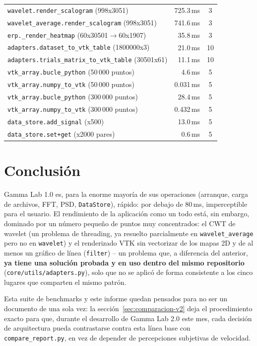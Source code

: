 \documentclass[11pt,a4paper]{article}
\begin{document}
\begin{center}
\begin{longtable}{L{9.5cm}rc}
\texttt{wavelet.render\_\allowbreak scalogram} (998x3051) & 725.3\,ms & 3 \\
\texttt{wavelet\_\allowbreak average.render\_\allowbreak scalogram} (998x3051) & 741.6\,ms & 3 \\
\texttt{erp.\_\allowbreak render\_\allowbreak heatmap} (60x30501$\to$60x1907) & 35.8\,ms & 3 \\
\texttt{adapters.dataset\_\allowbreak to\_\allowbreak vtk\_\allowbreak table} (1800000x3) & 21.0\,ms & 10 \\
\texttt{adapters.trials\_\allowbreak matrix\_\allowbreak to\_\allowbreak vtk\_\allowbreak table} (30501x61) & 11.1\,ms & 10 \\
\texttt{vtk\_\allowbreak array.bucle\_\allowbreak python} (50\,000 puntos) & 4.6\,ms & 5 \\
\texttt{vtk\_\allowbreak array.numpy\_\allowbreak to\_\allowbreak vtk} (50\,000 puntos) & 0.031\,ms & 5 \\
\texttt{vtk\_\allowbreak array.bucle\_\allowbreak python} (300\,000 puntos) & 28.4\,ms & 5 \\
\texttt{vtk\_\allowbreak array.numpy\_\allowbreak to\_\allowbreak vtk} (300\,000 puntos) & 0.432\,ms & 5 \\
\texttt{data\_\allowbreak store.add\_\allowbreak signal} (x500) & 13.0\,ms & 5 \\
\texttt{data\_\allowbreak store.set+get} (x2000 pares) & 0.6\,ms & 5 \\
\bottomrule
\end{longtable}
\end{center}

\section{Conclusión}

Gamma Lab 1.0 es, para la enorme mayoría de sus operaciones (arranque, carga de archivos, FFT, PSD,
\texttt{DataStore}), rápido: por debajo de 80\,ms, imperceptible para el usuario. El rendimiento de la
aplicación como un todo está, sin embargo, dominado por un número pequeño de puntos muy concentrados: el CWT
de wavelet (un problema de threading, ya resuelto parcialmente en \texttt{wavelet\_\allowbreak average} pero
no en \texttt{wavelet}) y el renderizado VTK sin vectorizar de los mapas 2D y de al menos un gráfico de línea
(\texttt{filter}) -- un problema que, a diferencia del anterior, \textbf{ya tiene una solución probada y en
uso dentro del mismo repositorio} (\texttt{core/utils/adapters.py}), solo que no se aplicó de forma
consistente a los cinco lugares que comparten el mismo patrón.

Esta suite de benchmarks y este informe quedan pensados para no ser un documento de una sola vez: la
sección~\ref{sec:comparacion-v2} deja el procedimiento exacto para que, durante el desarrollo de Gamma Lab
2.0 este mes, cada decisión de arquitectura pueda contrastarse contra esta línea base con
\texttt{compare\_\allowbreak report.py}, en vez de depender de percepciones subjetivas de velocidad.
\end{document}
